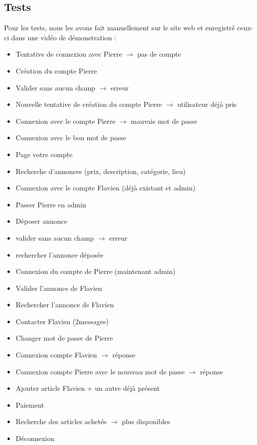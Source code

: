 \subsection{Tests}

Pour les tests, nous les avons fait manuellement sur le site web et enregistré ceux-ci dans une vidéo de démonstration :
\begin{itemize}
\item Tentative de connexion avec Pierre $\rightarrow$ pas de compte
\item Création du compte Pierre
\item Valider sans aucun champ $\rightarrow$ erreur 
\item Nouvelle tentative de création du compte Pierre $\rightarrow$ utilisateur déjà pris
\item Connexion avec le compte Pierre $\rightarrow$ mauvais mot de passe 
\item Connexion avec le bon mot de passe
\item Page votre compte
\item Recherche d’annonces (prix, description, catégorie, lieu)
\item Connexion avec le compte Flavien (déjà existant et admin)
\item Passer Pierre en admin
\item Déposer annonce
\item valider sans aucun champ $\rightarrow$ erreur
\item rechercher l'annonce déposée
\item Connexion du compte de Pierre (maintenant admin)
\item Valider l'annonce de Flavien
\item Rechercher l'annonce de Flavien 
\item Contacter Flavien (2messages)
\item Changer mot de passe de Pierre
\item Connexion compte Flavien $\rightarrow$ réponse
\item Connexion compte Pierre avec le nouveau mot de passe $\rightarrow$ réponse
\item Ajouter article Flavien  + un autre déjà présent
\item Paiement
\item Recherche des articles achetés $\rightarrow$ plus disponibles
\item Déconnexion
\end{itemize}
